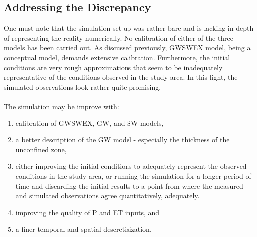 \subsection{Addressing the Discrepancy}
One must note that the simulation set up was rather bare and is lacking in depth of representing the reality numerically. No calibration of either of the three models has been carried out. As discussed previously, GWSWEX model, being a conceptual model, demands extensive calibration. Furthermore, the initial conditions are very rough approximations that seem to be inadequately representative of the conditions observed in the study area. In this light, the simulated observations look rather quite promising.
\\ \\
The simulation may be improve with:
\begin{enumerate}
    \item calibration of GWSWEX, GW, and SW models,
    \item a better description of the GW model - especially the thickness of the unconfined zone,
    \item either improving the initial conditions to adequately represent the observed conditions in the study area, or running the simulation for a longer period of time and discarding the initial results to a point from where the measured and simulated observations agree quantitatively, adequately.
    \item improving the quality of P and ET inputs, and
    \item a finer temporal and spatial descretisization. 
\end{enumerate}

